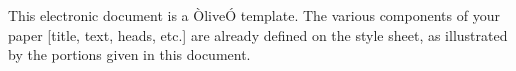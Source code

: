 This electronic document is a ÒliveÓ template. The various components of your paper [title, text, heads, etc.] are already defined on the style sheet, as illustrated by the portions given in this document.
